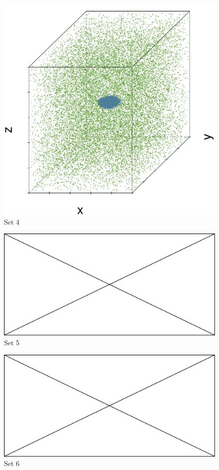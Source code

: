 \begin{subfigure}{0.23\textwidth}
	\centering
	\includegraphics[width=\textwidth]{3/img/datasetplot_baakman_1_60000.pdf}
	\caption{Set 4}
	\label{fig:3:simulated:datasets:baakman1}
\end{subfigure}
\begin{subfigure}{0.23\textwidth}
	\centering
	\includegraphics[width=\textwidth]{img/missingfigure.png}
	\caption{Set 5}
	\label{fig:3:simulated:datasets:baakman2}
\end{subfigure}	
\begin{subfigure}{0.23\textwidth}
	\centering
	\includegraphics[width=\textwidth]{img/missingfigure.png}
	\caption{Set 6}
	\label{fig:3:simulated:datasets:baakman3}
\end{subfigure}			
